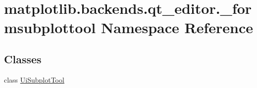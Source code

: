 \hypertarget{namespacematplotlib_1_1backends_1_1qt__editor_1_1__formsubplottool}{}\section{matplotlib.\+backends.\+qt\+\_\+editor.\+\_\+formsubplottool Namespace Reference}
\label{namespacematplotlib_1_1backends_1_1qt__editor_1_1__formsubplottool}
\subsection*{Classes}
\begin{DoxyCompactItemize}
\item 
class \hyperlink{classmatplotlib_1_1backends_1_1qt__editor_1_1__formsubplottool_1_1UiSubplotTool}{Ui\+Subplot\+Tool}
\end{DoxyCompactItemize}
